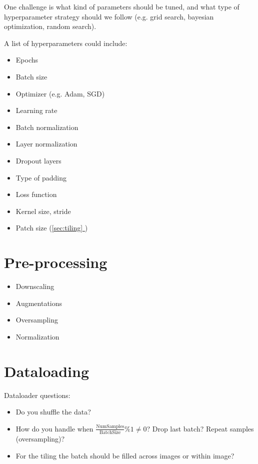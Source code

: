 \documentclass[12pt, a4paper]{article}
\newcommand*{\fullref}[1]{\hyperref[{#1}]{\ref*{#1} \nameref*{#1}}}
\begin{document}
One challenge is what kind of parameters should be tuned, and what type of hyperparameter strategy should we follow (e.g. grid search, bayesian optimization, random search).

A list of hyperparameters could include:
\begin{itemize}
    \itemsep -0.2em
    \item Epochs
    \item Batch size
    \item Optimizer (e.g. Adam, SGD)
    \item Learning rate
    \item Batch normalization
    \item Layer normalization
    \item Dropout layers
    \item Type of padding
    \item Loss function
    \item Kernel size, stride
    \item Patch size (\fullref{sec:tiling})
\end{itemize}



\section{Pre-processing}

\begin{itemize}
    \itemsep -0.2em
    \item Downscaling
    \item Augmentations
    \item Oversampling
    \item Normalization
\end{itemize}

\section{Dataloading}

Dataloader questions:
\begin{itemize}
    \itemsep -0.2em
    \item Do you shuffle the data?
    \item How do you handle when $\frac{\text{NumSamples}}{\text{BatchSize}} \% 1 \neq 0$? Drop last batch? Repeat samples (oversampling)?
    \item For the tiling the batch should be filled across images or within image?
\end{itemize}
\end{document}
